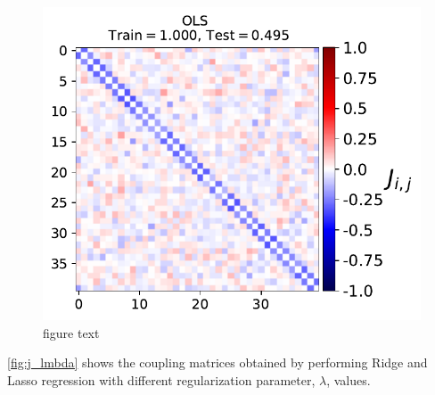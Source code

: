 \begin{figure}[H]
\begin{center}\includegraphics[scale=0.6]{latex/figures/ising_J_ols.pdf}
\end{center}
\caption{figure text}
\label{fig:j_ols}
\end{figure}

\autoref{fig:j_lmbda} shows the coupling matrices obtained by performing Ridge and Lasso regression with different regularization parameter, $\lambda$, values.

